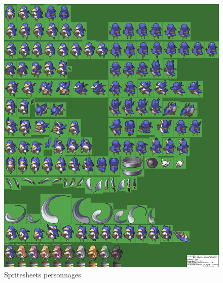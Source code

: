 \begin{figure}[H]
\includegraphics[scale=0.15]{images/enn1.png}
\centering
\caption{Spritesheets personnages}
\label{fig:img3}
\end{figure}
